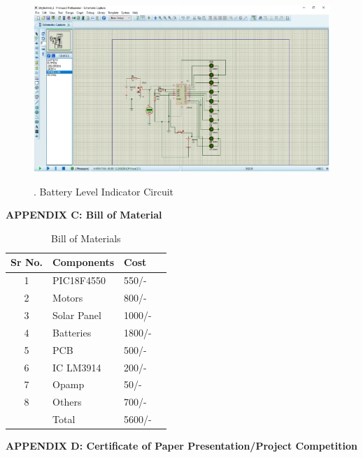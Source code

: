 \documentclass[a4paper,12pt]{article}
\begin{document}
\newpage
\begin{figure}[!h]
\centering
\includegraphics[scale=0.5]{bli.png}\\
\caption{. Battery Level Indicator Circuit}
\end{figure}

\newpage
\begin{center}
\LARGE\textbf{APPENDIX C: Bill of Material}
\end{center}
\begin{table}[!ht]
\centering

\begin{adjustbox}{width=0.7\textwidth}
\begin{tabular}{|c|l|l|p{6cm}|}
\hline
\textbf{Sr No.}
&
\textbf{Components}
&
\textbf{Cost}\\
\hline
1
&
PIC18F4550
&
550/-\\
\hline
2
&
Motors
&
800/-\\
\hline
3
&
Solar Panel
&
1000/-\\
\hline
4
&
Batteries
&
1800/-\\
\hline
5
&
PCB
&
500/-\\
\hline
6
&
IC LM3914
&
200/-\\
\hline
7
&
Opamp
&
50/-\\
\hline
8
&
Others
&
700/-\\
\hline

&
Total
&
5600/-\\
\hline
\end{tabular}
\end{adjustbox}
\caption{Bill of Materials}
\end{table}
\clearpage


\newpage
\thispagestyle{empty}
\vspace*{0.25\textheight}
\begin{center}
\LARGE\textbf{APPENDIX D: Certificate of Paper Presentation/Project Competition}
\end{center}
\newpage

\newpage

\newpage

\end{document}
